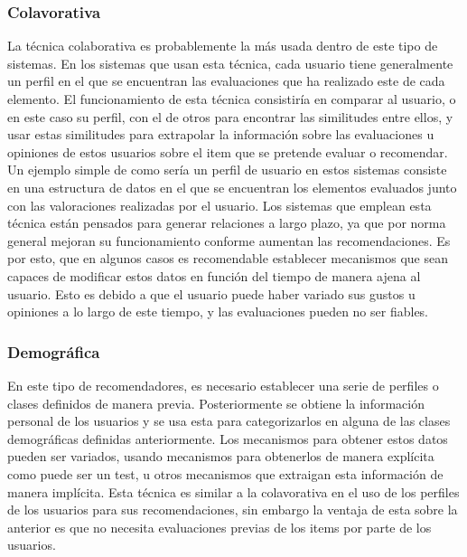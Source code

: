 \subsubsection{Colavorativa}
La técnica colaborativa es probablemente la más usada dentro de este tipo de sistemas. En los sistemas que usan esta técnica, cada usuario tiene generalmente un perfil en el que se encuentran las evaluaciones que ha realizado este de cada elemento. El funcionamiento de esta técnica consistiría en comparar al usuario, o en este caso su perfil, con el de otros para encontrar las similitudes entre ellos, y usar estas similitudes para extrapolar la información sobre las evaluaciones u opiniones de estos usuarios sobre el item que se pretende evaluar o recomendar. Un ejemplo simple de como sería un perfil de usuario en estos sistemas consiste en una estructura de datos en el que se encuentran los elementos evaluados junto con las valoraciones realizadas por el usuario. Los sistemas que emplean esta técnica están pensados para generar relaciones a largo plazo, ya que por norma general mejoran su funcionamiento conforme aumentan las recomendaciones. Es por esto, que en algunos casos es recomendable establecer mecanismos que sean capaces de modificar estos datos en función del tiempo de manera ajena al usuario. Esto es debido a que el usuario puede haber variado sus gustos u opiniones a lo largo de este tiempo, y las evaluaciones pueden no ser fiables. 


\subsubsection{Demográfica}
En este tipo de recomendadores, es necesario establecer una serie de perfiles o clases definidos de manera previa. Posteriormente se obtiene la información personal de los usuarios y se usa esta para categorizarlos en alguna de las clases demográficas definidas anteriormente. Los mecanismos para obtener estos datos pueden ser variados, usando mecanismos para obtenerlos de manera explícita como puede ser un test, u otros mecanismos que extraigan esta información de manera implícita. Esta técnica es similar a la colavorativa en el uso de los perfiles de los usuarios para sus recomendaciones, sin embargo la ventaja de esta sobre la anterior es que no necesita evaluaciones previas de los items por parte de los usuarios.


